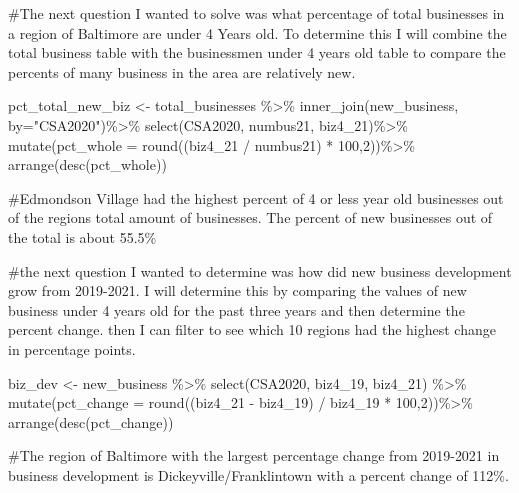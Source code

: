\documentclass[
  letterpaper,
  DIV=11,
  numbers=noendperiod]{scrartcl}
\newenvironment{Shaded}{\begin{snugshade}}{\end{snugshade}}
\newcommand{\AttributeTok}[1]{\textcolor[rgb]{0.40,0.45,0.13}{#1}}
\newcommand{\CommentTok}[1]{\textcolor[rgb]{0.37,0.37,0.37}{#1}}
\newcommand{\DecValTok}[1]{\textcolor[rgb]{0.68,0.00,0.00}{#1}}
\newcommand{\FunctionTok}[1]{\textcolor[rgb]{0.28,0.35,0.67}{#1}}
\newcommand{\NormalTok}[1]{\textcolor[rgb]{0.00,0.23,0.31}{#1}}
\newcommand{\OtherTok}[1]{\textcolor[rgb]{0.00,0.23,0.31}{#1}}
\newcommand{\SpecialCharTok}[1]{\textcolor[rgb]{0.37,0.37,0.37}{#1}}
\newcommand{\StringTok}[1]{\textcolor[rgb]{0.13,0.47,0.30}{#1}}
\begin{document}
\begin{Shaded}
\begin{Highlighting}[]
\CommentTok{\#The next question I wanted to solve was what percentage of total businesses in a region of Baltimore are under 4 Years old. To determine this I will combine the total business table with the businessmen under 4 years old table to compare the percents of many business in the area are relatively new. }

\NormalTok{pct\_total\_new\_biz }\OtherTok{\textless{}{-}}\NormalTok{ total\_businesses }\SpecialCharTok{\%\textgreater{}\%}
\FunctionTok{inner\_join}\NormalTok{(new\_business, }\AttributeTok{by=}\StringTok{"CSA2020"}\NormalTok{)}\SpecialCharTok{\%\textgreater{}\%}
\FunctionTok{select}\NormalTok{(CSA2020, numbus21, biz4\_21)}\SpecialCharTok{\%\textgreater{}\%}
\FunctionTok{mutate}\NormalTok{(}\AttributeTok{pct\_whole =} \FunctionTok{round}\NormalTok{((biz4\_21 }\SpecialCharTok{/}\NormalTok{ numbus21) }\SpecialCharTok{*} \DecValTok{100}\NormalTok{,}\DecValTok{2}\NormalTok{))}\SpecialCharTok{\%\textgreater{}\%}
\FunctionTok{arrange}\NormalTok{(}\FunctionTok{desc}\NormalTok{(pct\_whole))}

\CommentTok{\#Edmondson Village had the highest percent of 4 or less year old businesses out of the regions total amount of businesses. The percent of new businesses out of the total is about 55.5\% }
\end{Highlighting}
\end{Shaded}

\begin{Shaded}
\begin{Highlighting}[]
\CommentTok{\#the next question I wanted to determine was how did new business development grow from 2019{-}2021. I will determine this by comparing the values of new business under 4 years old for the past three years and then determine the percent change. then I can filter to see which 10 regions had the highest change in percentage points. }

\NormalTok{biz\_dev }\OtherTok{\textless{}{-}}\NormalTok{ new\_business }\SpecialCharTok{\%\textgreater{}\%}
\FunctionTok{select}\NormalTok{(CSA2020, biz4\_19, biz4\_21) }\SpecialCharTok{\%\textgreater{}\%}
\FunctionTok{mutate}\NormalTok{(}\AttributeTok{pct\_change =} \FunctionTok{round}\NormalTok{((biz4\_21 }\SpecialCharTok{{-}}\NormalTok{ biz4\_19) }\SpecialCharTok{/}\NormalTok{ biz4\_19 }\SpecialCharTok{*} \DecValTok{100}\NormalTok{,}\DecValTok{2}\NormalTok{))}\SpecialCharTok{\%\textgreater{}\%}
\FunctionTok{arrange}\NormalTok{(}\FunctionTok{desc}\NormalTok{(pct\_change))}

\CommentTok{\#The region of Baltimore with the largest percentage change from 2019{-}2021 in business development is Dickeyville/Franklintown with a percent change of 112\%. }
\end{Highlighting}
\end{Shaded}
\end{document}
